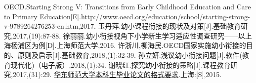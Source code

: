 \documentclass[a4paper,oneside]{article}
\begin{document}
\newpage
\begin{thebibliography}{9}

OECD.Starting Strong V: Transitions from Early Childhood Education and Care to Primary Education[E].http://www.oecd.org/education/school/starting-strong-v-9789264276253-en.htm,2017.
玉丹萍.幼小课程衔接的现状及对策[J].基础教育研究,2017,(19):87-88.
徐丽丽.幼小衔接视角下小学新生学习适应性调查研究——以上海杨浦区为例[D].上海师范大学,2016.
许浙川,柳海民.OECD国家实施幼小衔接的目的、原则及启示[J].基础教育,2018,(1):32-39. 
孙立妍.浅议幼小衔接问题[J].软件(教育现代化)（电子版）,2018,(1):34.
谢晓红.探究幼小衔接的策略[J].课程教育研究,2017,(31):29.
\href{http://www.shehuikxzl.cn/n/dsrqw/book/base/13784342/b604642171aa42ee9e6133f1371ba905/d57792147328b6fe71b74b598959f897.shtml?dm=1145044855&dxid=000015423860&tp=dsrquanwen&uf=1&userid=1468&bt=qw&firstdrs=http%253A%252F%252Fbook.duxiu.com%252FbookDetail.jsp%253FdxNumber%253D000015423860%2526d%253DEC1B839C641F9B5E1B7E7751519FF136&pagetype=6&sKey=%E5%8D%8E%E4%B8%9C%E5%B8%88%E8%8C%83%E5%A4%A7%E5%AD%A6%E6%9C%AC%E7%A7%91%E7%94%9F%E6%AF%95%E4%B8%9A%E8%AE%BA%E6%96%87%E6%A0%BC%E5%BC%8F&sch=A.1%E5%8D%8E%E4%B8%9C%E5%B8%88%E8%8C%83%E5%A4%A7%E5%AD%A6%E6%9C%AC%E7%A7%91%E7%94%9F%E6%AF%95%E4%B8%9A%E8%AE%BA&searchtype=qw&template=dsrquanwen&zjid=000015423860_120}{华东师范大学本科生毕业论文的格式要求}.上海:[S],2015.

\end{thebibliography}
\newpage
\renewcommand{\abstractname}{致谢}
\begin{abstract}
本论文全篇使用在线 \LaTeX 书写和发布工具\textbf{ Overleaf }\emph{v2}进行文字编辑及排版设计。因此，感谢 Overleaf平台的在线支持；感谢  \textsc{t\kern -.12em\lower.4ex\hbox{e}\kern-.1em x}的发明者 Donald Knuth。
\end{abstract}
\end{document}
